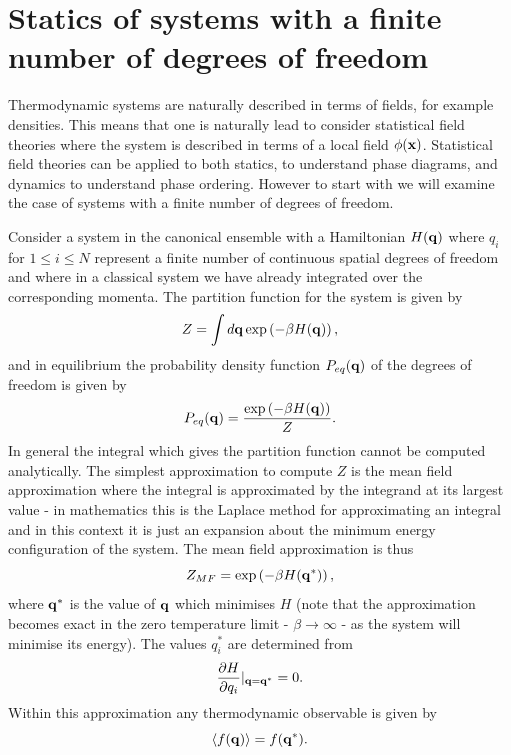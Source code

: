 \section{Statics of systems with a finite number of degrees of freedom}

Thermodynamic systems are naturally described in terms of fields, for example densities. This means that one is naturally lead to consider statistical field theories where the system is described in terms of a local field $\phi({\bf x})$. Statistical field theories can be applied to both statics, to understand phase diagrams, and dynamics to understand phase ordering. However to start with we will examine the case of systems with a finite number of degrees of freedom. 

Consider a system in the canonical ensemble with a Hamiltonian $H({\bf q})$ where $q_i$ for 
$1\leq i\leq N$ represent a finite number of continuous spatial degrees of freedom and where in a classical system we have already integrated over the corresponding momenta. The partition function for the system is given by
\begin{equation}
Z = \int d{\bf q} \exp\left(-\beta H({\bf q})\right),
\end{equation}
and in equilibrium the probability density function $P_{eq}({\bf q})$ of the degrees of freedom is given by 
\begin{equation}
P_{eq}({\bf q}) = \frac{\exp\left(-\beta H({\bf q})\right)}{Z}.\label{eqdis}
\end{equation}
In general the integral which gives the  partition function cannot be computed analytically.
The simplest approximation to compute $Z$ is the mean field approximation where the integral 
is approximated by the integrand at its largest value - in mathematics this is the Laplace method for approximating an integral and in this context it is just an expansion about the minimum energy configuration of the system. The mean field approximation is thus
\begin{equation}
Z_{MF}= \exp\left(-\beta H({\bf q}^*)\right),
\end{equation}
where ${\bf q}^*$ is the value of ${\bf q}$ which minimises $H$ (note that the approximation becomes exact in the zero temperature limit - $\beta \to \infty$   - as the system will minimise its energy). The values $q_i^*$ are determined from
\begin{equation}
\frac{\partial H}{\partial q_i}|_{{\bf q}={\bf q^*}}=0.
\end{equation}
Within this approximation any thermodynamic observable is given by
\begin{equation}
\langle f({\bf q}) \rangle = f({\bf q}^*).
\end{equation}

